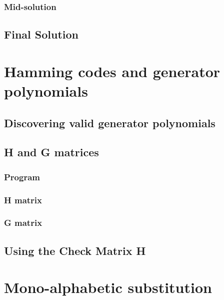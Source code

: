 \documentclass[pdftex, 12pt, a4paper]{article}
\begin{document}
\subsubsection{Mid-solution}\label{last-byte-out}

\subsection{Final Solution}\label{q1-solution}
\pagebreak

\section{Hamming codes and generator polynomials}
\subsection{Discovering valid generator polynomials}\label{hammgen}

\pagebreak

\subsection{H and G matrices}
\subsubsection{Program}\label{hammgen-hg}

\subsubsection{H matrix}\label{h-matrix}
\subsubsection{G matrix}\label{g-matrix}
\pagebreak

\subsection{Using the Check Matrix H}\label{check-matrix}

\pagebreak

\section{Mono-alphabetic substitution}
\end{document}
